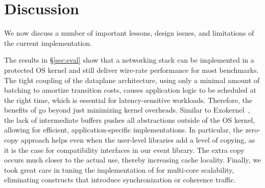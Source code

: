 
\section{Discussion}
\label{sec:disc}

We now discuss a number of important lessons, design issues, and
limitations of the current \ix implementation.

 The results in \S\ref{sec:eval}
show that a networking stack can be implemented in a protected OS
kernel and still deliver wire-rate performance for most benchmarks.
The tight coupling of the dataplane architecture, using only a minimal
amount of batching to amortize transition costs, causes application
logic to be scheduled at the right time, which is essential for
latency-sensitive workloads.  Therefore, the benefits of \ix go beyond
just minimizing kernel overheads. Similar to
Exokernel~\cite{DBLP:conf/sosp/EnglerKO95}, the lack of intermediate
buffers pushes all abstractions outside of the OS kernel, allowing for
efficient, application-specific implementations.  In particular, the
zero-copy approach helps even when the user-level libraries add a
level of copying, as it is the case for compatibility interfaces in
our event library.  The extra copy occurs much closer to the actual use,
thereby increasing cache locality.  Finally, we took great care in
tuning the implementation of \ix for multi-core scalability,
eliminating constructs that introduce synchronization or coherence
traffic.


